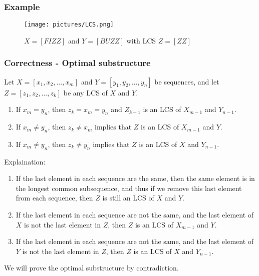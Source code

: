 \subsubsection*{Example}
\begin{figure}[H]
  \texttt{[image: pictures/LCS.png]}
  \caption{$X=[FIZZ]$ and $Y=[BUZZ]$ with LCS $Z=[ZZ]$}
\end{figure}

\subsubsection*{Correctness - Optimal substructure}
Let $X=[x_1,x_2,\dots,x_m]$ and $Y=[y_1,y_2,\dots,y_n]$ be sequences, and let
$Z=[z_1,z_2,\dots,z_k]$ be any LCS of $X$ and $Y$.
\begin{enumerate}
  \item If $x_m=y_n$, then $z_k=x_m=y_n$ and $Z_{k-1}$ is an LCS of $X_{m-1}$
  and $Y_{n-1}$.
  \item If $x_m\neq y_n$, then $z_k\neq x_m$ implies that $Z$ is an LCS of
  $X_{m-1}$ and $Y$.
  \item If $x_m\neq y_n$, then $z_k\neq y_n$ implies that $Z$ is an LCS of $X$
  and $Y_{n-1}$.
\end{enumerate}
Explaination:
\begin{enumerate}
  \item If the last element in each sequence are the same, then the same
  element is in the longest common subsequence, and thus if we remove this last
  element from each sequence, then $Z$ is still an LCS of $X$ and $Y$.
  \item If the last element in each sequence are not the same, and the last
  element of $X$ is not the last element in $Z$, then $Z$ is an LCS of
  $X_{m-1}$ and $Y$.
  \item If the last element in each sequence are not the same, and the last
  element of $Y$ is not the last element in $Z$, then $Z$ is an LCS of $X$ and
  $Y_{n-1}$.
\end{enumerate}
We will prove the optimal substructure by contradiction.

